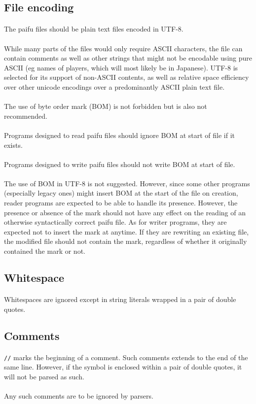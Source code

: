 \documentclass[%
	a4paper%
	,10pt%
	,twoside%
	,notitlepage%
]{article}%
\newcommand*{\ruleSymbol}{\textjapanese{⚠}}%
\newcommand*{\ruleMargin}{\marginpar{\flushright{}\ruleSymbol{}}}%
\newcommand*{\rulePar}{\paragraph*{\ruleMargin{}}}%
\begin{document}
	\subsection{File encoding}%
		\rulePar{}The paifu files should be plain text files encoded in UTF-8. %
		\paragraph*{}While many parts of the files would only require ASCII characters, the file can contain comments as well as other strings that might not be encodable using pure ASCII (eg names of players, which will most likely be in Japanese). UTF-8 is selected for its support of non-ASCII contents, as well as relative space efficiency over other unicode encodings over a predominantly ASCII plain text file. %
		\rulePar{}The use of byte order mark (BOM) is not forbidden but is also not recommended. %
		\rulePar{}Programs designed to read paifu files should ignore BOM at start of file if it exists. %
		\rulePar{}Programs designed to write paifu files should not write BOM at start of file. %
		\paragraph*{}The use of BOM in UTF-8 is not suggested. However, since some other programs (especially legacy ones) might insert BOM at the start of the file on creation, reader programs are expected to be able to handle its presence. However, the presence or absence of the mark should not have any effect on the reading of an otherwise syntactically correct paifu file. As for writer programs, they are expected not to insert the mark at anytime. If they are rewriting an existing file, the modified file should not contain the mark, regardless of whether it originally contained the mark or not. %
	\subsection{Whitespace}%
		\rulePar{}Whitespaces are ignored except in string literals wrapped in a pair of double quotes. %
		\subsection{Comments}\label{subsec:cmt}%
		\rulePar{}\texttt{//} marks the beginning of a comment. Such comments extends to the end of the same line. However, if the symbol is enclosed within a pair of double quotes, it will not be parsed as such. %
		\rulePar{}Any such comments are to be ignored by parsers. %
\end{document}
